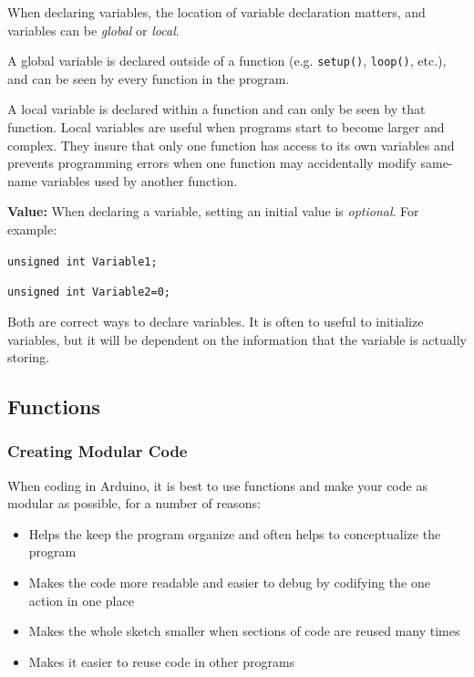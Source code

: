 When declaring variables, the location of variable declaration matters, and variables can be \textit{global} or \textit{local}.

A global variable is declared outside of a function (e.g. \texttt{setup()}, \texttt{loop()}, etc.), and can be seen by every function in the program.  

A local variable is declared within a function and can only be seen by that function. Local variables are useful when programs start to become larger and complex.  They insure that only one function has access to its own variables and prevents programming errors when one function may accidentally modify same-name variables used by another function. 

\par \textbf{Value:} When declaring a variable, setting an initial value is \textit{optional}. For example:
\par \hspace{4ex} \texttt{unsigned int Variable1;}
\par \hspace{4ex}  \texttt{unsigned int Variable2=0;}
\par Both are correct ways to declare variables. It is often to useful to initialize variables, but it will be dependent on the information that the variable is actually storing. 

\subsection*{Functions}

\subsubsection*{Creating Modular Code}
When coding in Arduino, it is best to use functions and make your code as modular as possible, for a number of reasons:

\begin{itemize}
\item Helps the keep the program organize and often helps to conceptualize the program
\item Makes the code more readable and easier to debug by codifying the one action in one place
\item Makes the whole sketch smaller when sections of code are reused many times
\item Makes it easier to reuse code in other programs
\end{itemize}

